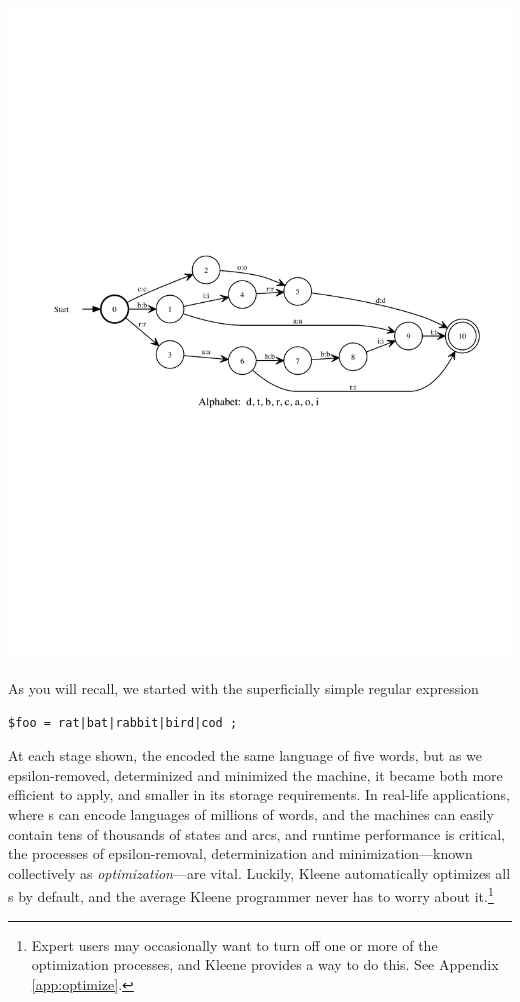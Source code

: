 \begin{center}
\includegraphics[width=135mm]{images/minimized.pdf}
\end{center}

As you will recall, we started with the superficially simple regular
expression


\begin{Verbatim}
$foo = rat|bat|rabbit|bird|cod ;
\end{Verbatim}

\noindent
At each stage shown, the \fsm{} encoded the same language of five words, but
as we epsilon-removed, determinized and minimized the machine, it became
both more efficient to apply, and smaller in its storage requirements.  In
real-life applications, where \fsm{}s can encode languages of millions of words, and the
machines can easily contain tens of thousands of states and arcs, and
runtime performance is critical, the
processes of epsilon-removal, determinization and minimization---known
collectively as \emph{optimization}---are vital.  Luckily, Kleene
automatically optimizes all \fsm{}s by default, and the average Kleene
programmer never has to worry about it.\footnote{Expert users may occasionally
want to turn off one or more of the optimization processes, and Kleene provides
a way to do this.  See Appendix \ref{app:optimize}.}


